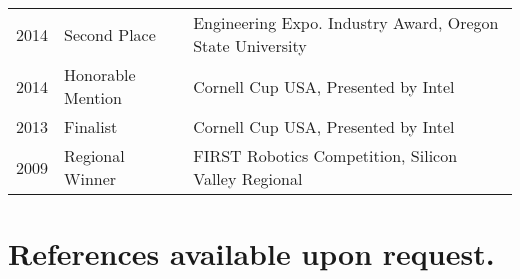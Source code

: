 \documentclass[letterpaper]{deedy-resume} %
\begin{document}
\begin{minipage}[t]{0.99\textwidth}
\begin{tabular}{rll}
2014	 & Second Place & Engineering Expo. Industry Award, Oregon State University\\
2014	 & Honorable Mention & Cornell Cup USA, Presented by Intel\\
2013	 & Finalist & Cornell Cup USA, Presented by Intel\\
2009	 & Regional Winner & FIRST Robotics Competition, Silicon Valley Regional\\
\end{tabular}

\sectionspace %

\section{References available upon request.}


\end{minipage} %

\end{document}
